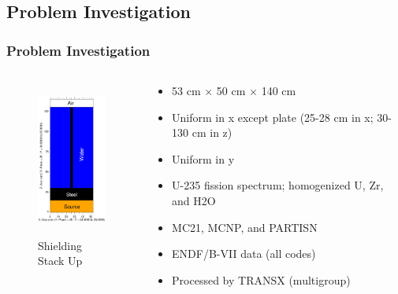 \documentclass[xcolor=x11names,compress]{beamer}
\renewcommand{\(}{\begin{columns}}
\renewcommand{\)}{\end{columns}}
\newcommand{\<}[1]{\begin{column}{#1}}
\renewcommand{\>}{\end{column}}
\begin{document}
\subsection{Problem Investigation}
\begin{frame}[fragile]
  \frametitle{Problem Investigation}
  	\begin{columns}
  	\begin{column}{0.45\textwidth}
  	\begin{figure}
  		\includegraphics[height=2in,clip]{plate-geometry}
  		\caption{Shielding Stack Up}
  	\end{figure}
  	\end{column}
 	\begin{column}{0.6\textwidth}
	\begin{itemize}
	\item 53 cm $\times$ 50 cm $\times$ 140 cm 
	\item Uniform in x except plate (25-28 cm in x; 30-130 cm in z)
	\item Uniform in y
	\item U-235 fission spectrum; homogenized U, Zr, and H2O
	\vspace*{1 em}
	\item MC21, MCNP, and PARTISN
	\item ENDF/B-VII data (all codes)
	\item Processed by TRANSX (multigroup)
	\end{itemize}
  	\end{column}
	\end{columns}
  
\end{frame}
\end{document}
